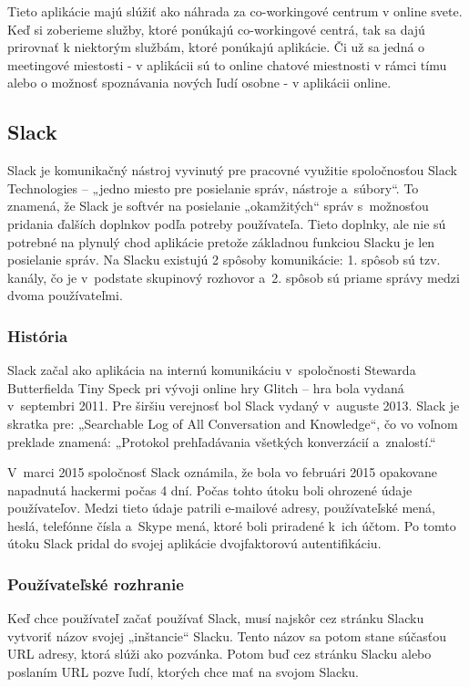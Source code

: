 \indent Tieto aplikácie majú slúžiť ako náhrada za co-workingové centrum v online svete. Keď si zoberieme služby, ktoré ponúkajú co-workingové centrá, tak sa dajú prirovnať k niektorým službám, ktoré ponúkajú aplikácie. Či už sa jedná o meetingové miestosti - v aplikácii sú to online chatové miestnosti v rámci tímu alebo o možnosť spoznávania nových ľudí osobne - v aplikácii online. 

\subsection{Slack}
\indent Slack je komunikačný nástroj vyvinutý pre pracovné využitie spoločnosťou Slack Technologies – „jedno miesto pre posielanie správ, nástroje a súbory“. To znamená, že Slack je softvér na posielanie „okamžitých“ správ s možnosťou pridania ďalších doplnkov podľa potreby používateľa. Tieto doplnky, ale nie sú potrebné na plynulý chod aplikácie pretože základnou funkciou Slacku je len posielanie správ. Na Slacku existujú 2 spôsoby komunikácie: 1. spôsob sú tzv. kanály, čo je v podstate skupinový rozhovor a 2. spôsob sú priame správy medzi dvoma používateľmi\cite{slack}. 

\subsubsection{História}
\indent Slack začal ako aplikácia na internú komunikáciu v spoločnosti Stewarda Butterfielda Tiny Speck pri vývoji online hry Glitch – hra bola vydaná v septembri 2011. Pre širšiu verejnosť bol Slack vydaný v auguste 2013. Slack je skratka pre: „Searchable Log of All Conversation and Knowledge“, čo vo voľnom preklade znamená: „Protokol prehľadávania všetkých konverzácií a znalostí.“

\indent V marci 2015 spoločnosť Slack oznámila, že bola vo februári 2015 opakovane napadnutá hackermi počas 4 dní. Počas tohto útoku boli ohrozené údaje používateľov. Medzi tieto údaje patrili e-mailové adresy, používateľské mená, heslá, telefónne čísla a Skype mená, ktoré boli priradené k ich účtom. Po tomto útoku Slack pridal do svojej aplikácie dvojfaktorovú autentifikáciu\cite{slack}. 

\subsubsection{Používateľské rozhranie}
\indent Keď chce používateľ začať používať Slack, musí najskôr cez stránku Slacku vytvoriť názov svojej „inštancie“ Slacku. Tento názov sa potom stane súčasťou URL adresy, ktorá slúži ako pozvánka. Potom buď cez stránku Slacku alebo poslaním URL pozve ľudí, ktorých chce mať na svojom Slacku. 

